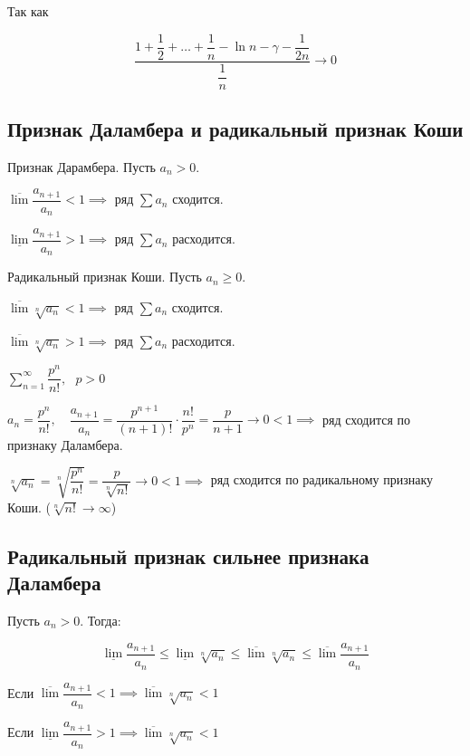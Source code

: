 Так как 

$$ \dfrac{1 + \dfrac{1}{2} + \dots + \dfrac{1}{n} - \ln n - \gamma - \dfrac{1}{2n}}{\dfrac{1}{n}} \to 0 $$

\subsection{Признак Даламбера и радикальный признак Коши}

\begin{theorem}
Признак Дарамбера. Пусть $a_n > 0$.

$\overline{\lim} \dfrac{a_{n+1}}{a_n} < 1 \implies $ ряд $\sum a_n$ сходится.

$\underline{\lim} \dfrac{a_{n+1}}{a_n} > 1 \implies $ ряд $\sum a_n$ расходится.
\end{theorem}

\begin{theorem}
Радикальный признак Коши. Пусть $a_n \geq 0$.

 $\overline{\lim} \sqrt[n]{a_n} < 1 \implies$ ряд $\sum a_n$ сходится.
 
  $\overline{\lim} \sqrt[n]{a_n} > 1 \implies$ ряд $\sum a_n$ расходится.
\end{theorem}

\begin{example}
$\sum_{n=1}^{\infty} \dfrac{p^{n}}{n!}, \ \ \ p > 0$

$a_n = \dfrac{p^n}{n!},\quad \dfrac{a_{n+1}}{a_n} = \dfrac{p^{n+1}}{(n+1)!} \cdot \dfrac{n!}{p^n} = \dfrac{p}{n + 1} \to 0 < 1 \implies $ ряд сходится по признаку Даламбера.

$\sqrt[n]{a_n} = \sqrt[n]{\dfrac{p^n}{n!}} = \dfrac{p}{\sqrt[n]{n!}} \to 0 < 1 \implies$ ряд сходится по радикальному признаку Коши. ($ \sqrt[n]{n!} \to \infty$)
\end{example}

\subsection{Радикальный признак сильнее признака Даламбера}

Пусть $a_n > 0$. Тогда:

$$ \underline{\lim} \dfrac{a_{n+1}}{a_n} \leq \underline{\lim}{\sqrt[n]{a_n}} \leq \overline{\lim}{\sqrt[n]{a_n}} \leq \overline{\lim}\dfrac{a_{n+1}}{a_n}$$

Если $\overline{\lim}\dfrac{a_{n+1}}{a_n} < 1 \implies \overline{\lim}{\sqrt[n]{a_n}} < 1$

Если $\underline{\lim}\dfrac{a_{n+1}}{a_n} > 1 \implies \overline{\lim}{\sqrt[n]{a_n}} < 1$

